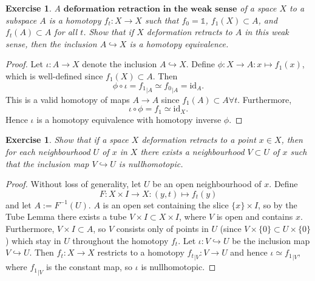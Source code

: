 \documentclass{article}
\newtheorem{exercise}[theorem]{Exercise}
\begin{document}
\begin{exercise}
A $\textbf{deformation retraction in the weak sense}$ of a space $X$ to a subspace $A$ is a homotopy $f_t:X\to X$ such that $f_0=\mathbb{1}$, $f_1(X)\subset A$, and $f_t(A)\subset A$ for all $t$. Show that if $X$ deformation retracts to $A$ in this weak sense, then the inclusion $A\hookrightarrow X$ is a homotopy equivalence.
\end{exercise}
\begin{proof}
Let $\iota:A\to X$ denote the inclusion $A\hookrightarrow X$. Define $\phi:X\to A:x\mapsto f_1(x)$, which is well-defined since $f_1(X)\subset A$. Then \[\phi\circ\iota={f_1}_{|A}\simeq {f_0}_{|A}=\text{id}_A.\]This is a valid homotopy of maps $A\to A$ since $f_1(A)\subset A\forall t$. Furthermore,\[\iota\circ\phi=f_1\simeq\text{id}_X.\] Hence $\iota$ is a homotopy equivalence with homotopy inverse $\phi$.
\end{proof}

\begin{exercise}
Show that if a space $X$ deformation retracts to a point $x\in X$, then for each neighbourhood $U$ of $x$ in $X$ there exists a neighbourhood $V\subset U$ of $x$ such that the inclusion map $V\hookrightarrow U$ is nullhomotopic.
\end{exercise}
\begin{proof}
Without loss of generality, let $U$ be an open neighbourhood of $x$. Define \[F:X\times I\to X:(y,t)\mapsto f_t(y)\] and let $A:=F^{-1}(U)$. $A$ is an open set containing the slice $\{x\}\times I$, so by the Tube Lemma there exists a tube $V\times I\subset X\times I$, where $V$ is open and contains $x$. Furthermore, $V\times I\subset A$, so $V$ consists only of points in $U$ (since $V\times\{0\}\subset U\times\{0\}$) which stay in $U$ throughout the homotopy $f_t$. Let $\iota:V\hookrightarrow U$ be the inclusion map $V\hookrightarrow U$. Then $f_t:X\to X$ restricts to a homotopy ${f_t}_{|V}:V\to U$ and hence $\iota\simeq {f_1}_{|V}$, where ${f_1}_{|V}$ is the constant map, so $\iota$ is nullhomotopic.
\end{proof}
\end{document}
